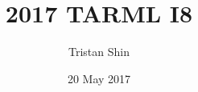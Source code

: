 \documentclass[a4paper, 12pt]{article}
\title{2017 TARML I8}
\author{Tristan Shin}
\date{20 May 2017}
\begin{document}
\maketitle



\hrulefill

\begin{solution}

\end{solution}
\end{document}

